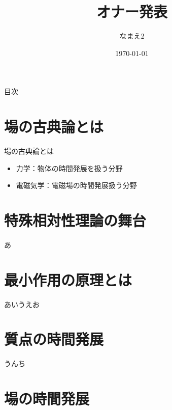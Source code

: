 \documentclass[unicode, lualatex, aspectratio=169, 10.5pt]{beamer}
\title[オナー発表]{オナー発表} %
\author[なまえ1]{なまえ2}     %
\institute[A]{B}              %
\date{\today}                 %
\begin{document}
\begin{frame}
  \titlepage
\end{frame}

\begin{frame}{目次}
  \tableofcontents
\end{frame}

\section{場の古典論とは}

\begin{frame}{場の古典論とは}
  \begin{itemize}
    \item 力学：物体の時間発展を扱う分野
    \item 電磁気学：電磁場の時間発展扱う分野
  \end{itemize}
\end{frame}



\section{特殊相対性理論の舞台}

\begin{frame}
  あ
\end{frame}

\section{最小作用の原理とは}

\begin{frame}
  あいうえお
\end{frame}


\section{質点の時間発展}

\begin{frame}
  うんち
\end{frame}

\section{場の時間発展}
\end{document}
